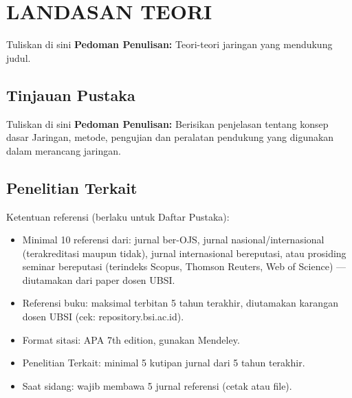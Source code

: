 \chapter{LANDASAN TEORI}


Tuliskan di sini \textbf{Pedoman Penulisan:} Teori-teori jaringan yang mendukung judul.


\section{Tinjauan Pustaka}


Tuliskan di sini \textbf{Pedoman Penulisan:} Berisikan penjelasan tentang konsep dasar Jaringan, metode, pengujian dan peralatan pendukung yang digunakan dalam merancang jaringan.


\section{Penelitian Terkait}

Ketentuan referensi (berlaku untuk Daftar Pustaka):
\begin{itemize}
    \item Minimal 10 referensi dari: jurnal ber-OJS, jurnal nasional/internasional (terakreditasi maupun tidak), jurnal internasional bereputasi, atau prosiding seminar bereputasi (terindeks Scopus, Thomson Reuters, Web of Science) --- diutamakan dari paper dosen UBSI.
    \item Referensi buku: maksimal terbitan 5 tahun terakhir, diutamakan karangan dosen UBSI (cek: repository.bsi.ac.id).
    \item Format sitasi: APA 7th edition, gunakan Mendeley.
    \item Penelitian Terkait: minimal 5 kutipan jurnal dari 5 tahun terakhir.
    \item Saat sidang: wajib membawa 5 jurnal referensi (cetak atau file).
\end{itemize}


